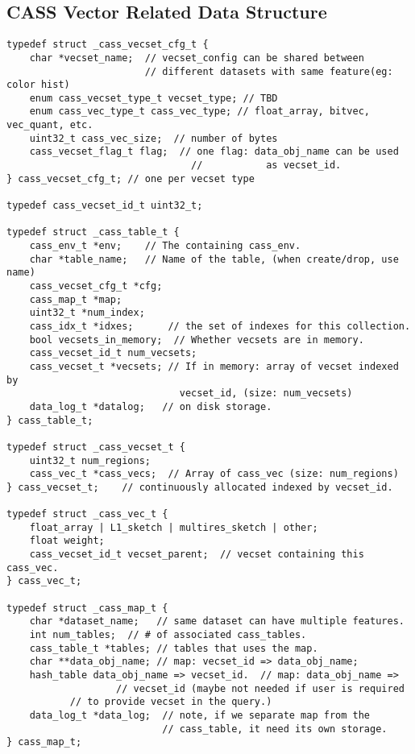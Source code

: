 \subsection{CASS Vector Related Data Structure}
\begin{verbatim}
typedef struct _cass_vecset_cfg_t {
    char *vecset_name;  // vecset_config can be shared between
                        // different datasets with same feature(eg: color hist)
    enum cass_vecset_type_t vecset_type; // TBD
    enum cass_vec_type_t cass_vec_type; // float_array, bitvec, vec_quant, etc.
    uint32_t cass_vec_size;  // number of bytes
    cass_vecset_flag_t flag;  // one flag: data_obj_name can be used
                                //           as vecset_id.
} cass_vecset_cfg_t; // one per vecset type

typedef cass_vecset_id_t uint32_t;

typedef struct _cass_table_t {
    cass_env_t *env;    // The containing cass_env.
    char *table_name;   // Name of the table, (when create/drop, use name)
    cass_vecset_cfg_t *cfg;
    cass_map_t *map;
    uint32_t *num_index;
    cass_idx_t *idxes;      // the set of indexes for this collection.
    bool vecsets_in_memory;  // Whether vecsets are in memory.
    cass_vecset_id_t num_vecsets;
    cass_vecset_t *vecsets; // If in memory: array of vecset indexed by
                              vecset_id, (size: num_vecsets)
    data_log_t *datalog;   // on disk storage.
} cass_table_t;

typedef struct _cass_vecset_t {
    uint32_t num_regions;
    cass_vec_t *cass_vecs;  // Array of cass_vec (size: num_regions)
} cass_vecset_t;    // continuously allocated indexed by vecset_id.

typedef struct _cass_vec_t {
    float_array | L1_sketch | multires_sketch | other;
    float weight;
    cass_vecset_id_t vecset_parent;  // vecset containing this cass_vec.
} cass_vec_t;

typedef struct _cass_map_t {
    char *dataset_name;   // same dataset can have multiple features.
    int num_tables;  // # of associated cass_tables.
    cass_table_t *tables; // tables that uses the map. 
    char **data_obj_name; // map: vecset_id => data_obj_name;
    hash_table data_obj_name => vecset_id.  // map: data_obj_name =>
                   // vecset_id (maybe not needed if user is required
		   // to provide vecset in the query.)
    data_log_t *data_log;  // note, if we separate map from the
                           // cass_table, it need its own storage.
} cass_map_t;


\end{verbatim}
